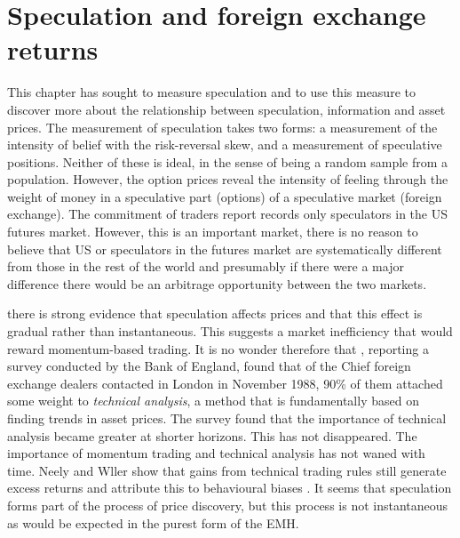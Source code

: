 \documentclass[12pt, a4paper, oneside]{article} %
\begin{document}
\section{Speculation and foreign exchange returns}
This chapter has sought to measure speculation and to use this measure to discover more about the relationship between speculation, information and asset prices.  The measurement of speculation takes two forms:  a measurement of the intensity of belief with the risk-reversal skew, and a measurement of speculative positions.  Neither of these is ideal, in the sense of being a random sample from a population.  However, the option prices reveal the intensity of feeling through the weight of money in a speculative part (options) of a speculative market (foreign exchange).  The commitment of traders report records only speculators in the US futures market.  However, this is an important market, there is no reason to believe that US or speculators in the futures market are systematically different from those in the rest of the world and presumably if there were a major difference there would be an arbitrage opportunity between the two markets.  

 there is strong evidence that speculation affects prices and that this effect is gradual rather than instantaneous.  This suggests a market inefficiency that would reward momentum-based trading.  It is no wonder therefore that \citep{TaylorTechnical}, reporting a survey conducted by the Bank of England, found that of the Chief foreign exchange dealers contacted in London in November 1988, 90\% of them attached some weight to \emph{technical analysis}, a method that is fundamentally based on finding trends in asset prices.  The survey found that the importance of technical analysis became greater at shorter horizons.  This has not disappeared.  The importance of momentum trading and technical analysis has not waned with time.  Neely and Wller  show that gains from technical trading rules still generate excess returns and attribute this to behavioural biases \citep{NeelyWeller}. It seems that speculation forms part of the process of price discovery, but this process is not instantaneous as would be expected in the purest form of the EMH.  
\end{document}
